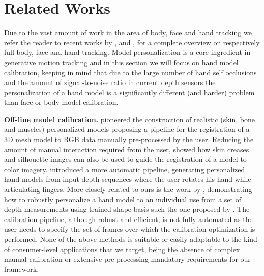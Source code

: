 \section{Related Works}
Due to the vast amount of work in the area of body, face and hand tracking we refer the reader to recent works by \cite{bogo2015detailed}, \cite{cao2016real} and \cite{taylor2016joint}, \cite{tkach2016sphere} for a complete overview on respectively full-body, face and hand tracking.
Model personalization is a core ingredient in generative motion tracking \cite{pons2011model} and in this section we will focus on hand model calibration, keeping in mind that due to the large number of hand self occlusions and the amount of signal-to-noise ratio in current depth sensors the personalization of a hand model is a significantly different (and harder) problem than face or body model calibration.  

\textbf{Off-line model calibration.}
\cite{albrecht2003construction} pioneered the construction of realistic (skin, bone and muscles) personalized models proposing a pipeline for the registration of a 3D mesh model to RGB data manually pre-processed by the user. Reducing the amount of manual interaction required from the user, \cite{rhee2006human} showed how skin creases and silhouette images can also be used to guide the registration of a model to color imagery. \cite{taylor2014user} introduced a more automatic pipeline, generating personalized hand models from input depth sequences where the user rotates his hand while articulating fingers. More closely related to ours is the work by \cite{tan2016fits}, demonstrating how to robustly personalize a hand model to an individual use from a set of depth measurements using trained shape basis such the one proposed by \cite{khamis2015learning}. The calibration pipeline, although robust and efficient, is not fully automated as the user needs to specify the set of frames over which the calibration optimization is performed. None of the above methods is suitable or easily adaptable to the kind of consumer-level applications that we target, being the absence of complex manual calibration or extensive pre-processing mandatory requirements for our framework.

